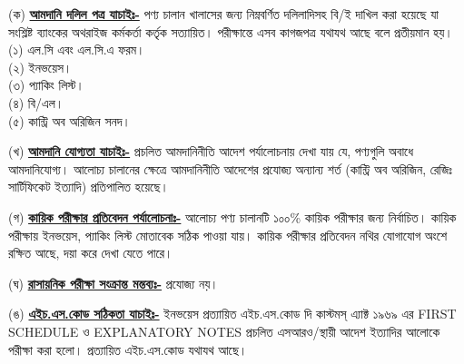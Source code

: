 \documentclass[11pt]{article}
\begin{document}
\begin{description}
 \item \hspace{1em} (ক)
 \underline{\textbf{আমদানি দলিল পত্র যাচাইঃ-}}
পণ্য চালান খালাসের জন্য নিম্নবর্ণিত দলিলাদিসহ বি/ই দাখিল করা
হয়েছে যা সংশ্লিষ্ট ব্যাংকের অথরাইজ কর্মকর্তা কর্তৃক সত্যায়িত।
পরীক্ষান্তে এসব কাগজপত্র যথাযথ আছে বলে প্রতীয়মান হয়।
\\
(১) এল.সি এবং এল.সি.এ ফরম।
\\
(২) ইনভয়েস।
\\
(৩) প্যাকিং লিস্ট।
\\
(৪) বি/এল।
\\
(৫) কান্ট্রি অব অরিজিন সনদ।

\item \hspace{1em} (খ)
\underline{\textbf{আমদানি যোগ্যতা যাচাইঃ-}}
প্রচলিত আমদানিনীতি আদেশ পর্যালোচনায় দেখা যায় যে, পণ্যগুলি অবাধে আমদানিযোগ্য।
আলোচ্য চালানের ক্ষেত্রে আমদানিনীতি আদেশের প্রযোজ্য অন্যান্য শর্ত (কান্ট্রি অব অরিজিন, রেজিঃ
সার্টিফিকেট ইত্যাদি) প্রতিপালিত হয়েছে।
\item \hspace{1em} (গ)
\underline{\textbf{কায়িক পরীক্ষার প্রতিবেদন পর্যালোচনাঃ-}}
আলোচ্য পণ্য চালানটি ১০০\% কায়িক পরীক্ষার জন্য নির্বাচিত। কায়িক পরীক্ষায় ইনভয়েস,
প্যাকিং লিস্ট মোতাবেক সঠিক পাওয়া যায়। কায়িক পরীক্ষার প্রতিবেদন নথির যোগাযোগ অংশে
রক্ষিত আছে, দয়া করে দেখা যেতে পারে।
\item \hspace{1em} (ঘ)
\underline{\textbf{রাসায়নিক পরীক্ষা সংক্রান্ত মন্তব্যঃ-}}
প্রযোজ্য নয়।
\item \hspace{1em} (ঙ)
\underline{\textbf{এইচ.এস.কোড সঠিকতা যাচাইঃ-}}
ইনভয়েস প্রত্যায়িত এইচ.এস.কোড দি কাস্টমস্ এ্যাক্ট ১৯৬৯ এর FIRST SCHEDULE ও
EXPLANATORY NOTES প্রচলিত এসআরও/স্থায়ী আদেশ ইত্যাদির আলোকে পরীক্ষা করা হলো।
প্রত্যায়িত এইচ.এস.কোড যথাযথ আছে।


\end{description}
\end{document}
